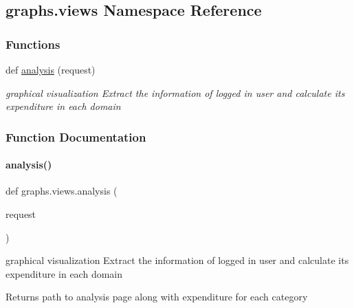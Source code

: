 \hypertarget{namespacegraphs_1_1views}{}\subsection{graphs.\+views Namespace Reference}
\label{namespacegraphs_1_1views}
\subsubsection*{Functions}
\begin{DoxyCompactItemize}
\item 
def \hyperlink{namespacegraphs_1_1views_a6dfde0819f237c42d29dcb5a5ff1a397}{analysis} (request)
\begin{DoxyCompactList}\small\item\em graphical visualization  Extract the information of logged in user and calculate its expenditure in each domain \end{DoxyCompactList}\end{DoxyCompactItemize}


\subsubsection{Function Documentation}
\mbox{\label{namespacegraphs_1_1views_a6dfde0819f237c42d29dcb5a5ff1a397}} 
\paragraph{\texorpdfstring{analysis()}{analysis()}}
{\footnotesize\ttfamily def graphs.\+views.\+analysis (\begin{DoxyParamCaption}\item[{}]{request }\end{DoxyParamCaption})}



graphical visualization  Extract the information of logged in user and calculate its expenditure in each domain 

\begin{DoxyReturn}{Returns}
path to analysis page along with expenditure for each category 
\end{DoxyReturn}
